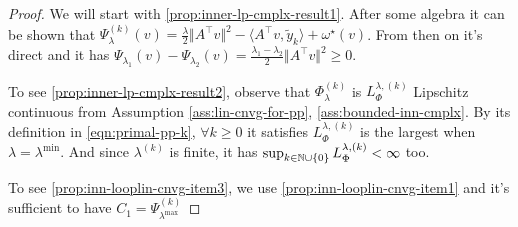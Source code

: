 \documentclass[12pt]{article}
\begin{document}
        \begin{proof}
            We will start with \ref{prop:inner-lp-cmplx-result1}. 
            After some algebra it can be shown that $\Psi_\lambda^{(k)}(v) = \frac{\lambda}{2}\Vert A^\top v\Vert^2 - \langle A^\top v, \tilde y_k\rangle + \omega^\star(v)$.
            From then on it's direct and it has $\Psi_{\lambda_1}(v) - \Psi_{\lambda_2}(v) = \frac{\lambda_1 - \lambda_2}{2}\Vert A^\top v\Vert^2 \ge 0$. 
            \par
            To see \ref{prop:inner-lp-cmplx-result2}, observe that $\Phi_\lambda^{(k)}$ is $L_{\Phi}^{\lambda, (k)}$ Lipschitz continuous from Assumption \ref{ass:lin-cnvg-for-pp}, \ref{ass:bounded-inn-cmplx}. 
            By its definition in \eqref{eqn:primal-pp-k}, $\forall k \ge 0$ it satisfies $L_{\Phi}^{\lambda, (k)}$ is the largest when $\lambda = \lambda^{\min}$. 
            And since $\lambda^{(k)}$ is finite, it has $\sup_{k \in \mathbb N \cup \{0\}}L_{\Phi}^{\lambda, (k)} < \infty$ too. 
            \par
            To see \ref{prop:inn-looplin-cnvg-item3}, we use \ref{prop:inn-looplin-cnvg-item1} and it's sufficient to have $C_1 = \Psi_{\lambda^{\max}}^{(k)}$
        \end{proof}
            




\end{document}
